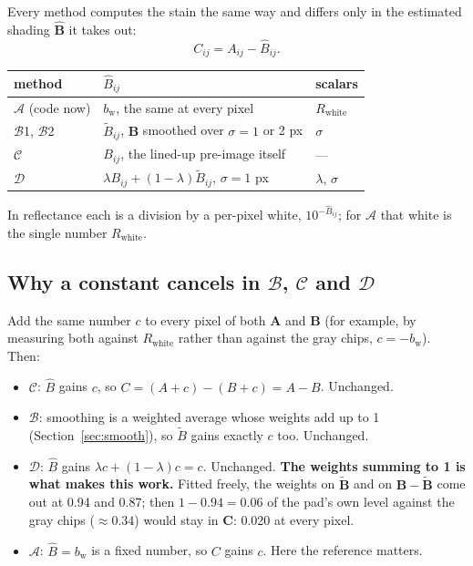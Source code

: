 \documentclass[11pt,letterpaper]{article}
\newcommand{\mA}{\mathbf{A}}   %
\newcommand{\mB}{\mathbf{B}}   %
\newcommand{\mC}{\mathbf{C}}   %
\newcommand{\tB}{\widetilde{\mathbf{B}}}
\newcommand{\hB}{\widehat{\mathbf{B}}}
\newcommand{\Rwhite}{R_{\text{white}}}
\newcommand{\bw}{b_{\text{w}}}
\newcommand{\MA}{\mathcal{A}}
\newcommand{\MB}{\mathcal{B}}
\newcommand{\MC}{\mathcal{C}}
\newcommand{\MD}{\mathcal{D}}
\begin{document}
Every method computes the stain the same way and differs only in the
estimated shading $\hB$ it takes out:
\begin{equation}
  C_{ij} = A_{ij} - \hat B_{ij}.
\end{equation}

\medskip
\begin{tabular}{@{}L{3.4cm}L{7.4cm}L{3.6cm}@{}}
\toprule
method & $\hat B_{ij}$ & scalars \\
\midrule
$\MA$ (code now) & $\bw$, the same at every pixel & $\Rwhite$ \\
$\MB$1, $\MB$2 & $\tilde B_{ij}$, $\mB$ smoothed over $\sigma = 1$ or 2 px & $\sigma$ \\
$\MC$ & $B_{ij}$, the lined-up pre-image itself & --- \\
$\MD$ & $\lambda B_{ij} + (1-\lambda)\tilde B_{ij}$, $\sigma = 1$ px & $\lambda$, $\sigma$ \\
\bottomrule
\end{tabular}

\medskip
\noindent In reflectance each is a division by a per-pixel white,
$10^{-\hat B_{ij}}$; for $\MA$ that white is the single number $\Rwhite$.

\subsection{Why a constant cancels in \texorpdfstring{$\MB$, $\MC$ and $\MD$}{B, C and D}}
\label{sec:cancel}

Add the same number $c$ to every pixel of both $\mA$ and $\mB$ (for
example, by measuring both against $\Rwhite$ rather than against the gray
chips, $c = -\bw$).  Then:
\begin{itemize}
  \item $\MC$: $\hat B$ gains $c$, so $C = (A + c) - (B + c) = A - B$.
    Unchanged.
  \item $\MB$: smoothing is a weighted average whose weights add up to 1
    (Section~\ref{sec:smooth}), so $\tilde B$ gains exactly $c$ too.
    Unchanged.
  \item $\MD$: $\hat B$ gains $\lambda c + (1-\lambda) c = c$.  Unchanged.
    \textbf{The weights summing to 1 is what makes this work.}  Fitted
    freely, the weights on $\tB$ and on $\mB - \tB$ come out at 0.94 and
    0.87; then $1 - 0.94 = 0.06$ of the pad's own level against the gray
    chips ($\approx 0.34$) would stay in $\mC$: 0.020 at every pixel.
  \item $\MA$: $\hat B = \bw$ is a fixed number, so $C$ gains $c$.  Here the
    reference matters.
\end{itemize}
\end{document}
